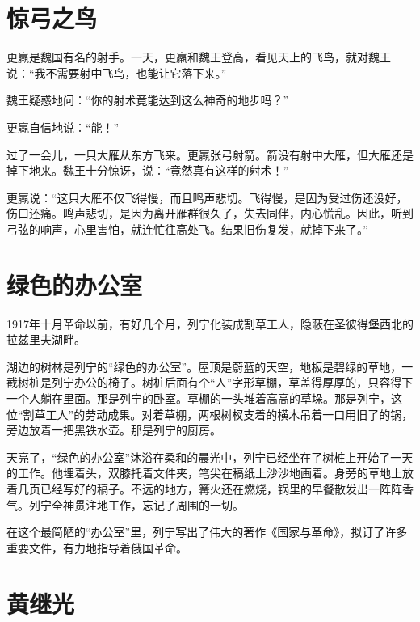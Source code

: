 \documentclass[12pt,UTF-8,openany]{ctexbook}
\begin{document}
\chapter{惊弓之鸟}

\begin{Large}
    
    更羸是魏国有名的射手。一天，更羸和魏王登高，看见天上的飞鸟，就对魏王说：“我不需要射中飞鸟，也能让它落下来。”
    
    魏王疑惑地问：“你的射术竟能达到这么神奇的地步吗？”
    
    更羸自信地说：“能！”
    
    过了一会儿，一只大雁从东方飞来。更羸张弓射箭。箭没有射中大雁，但大雁还是掉下地来。魏王十分惊讶，说：“竟然真有这样的射术！”
    
    更羸说：“这只大雁不仅飞得慢，而且鸣声悲切。飞得慢，是因为受过伤还没好，伤口还痛。鸣声悲切，是因为离开雁群很久了，失去同伴，内心慌乱。因此，听到弓弦的响声，心里害怕，就连忙往高处飞。结果旧伤复发，就掉下来了。”
    
\end{Large}

\chapter{绿色的办公室}

\begin{Large}
    
    1917年十月革命以前，有好几个月，列宁化装成割草工人，隐蔽在圣彼得堡西北的拉兹里夫湖畔。
    
    湖边的树林是列宁的“绿色的办公室”。屋顶是蔚蓝的天空，地板是碧绿的草地，一截树桩是列宁办公的椅子。树桩后面有个“人”字形草棚，草盖得厚厚的，只容得下一个人躺在里面。那是列宁的卧室。草棚的一头堆着高高的草垛。那是列宁，这位“割草工人”的劳动成果。对着草棚，两根树杈支着的横木吊着一口用旧了的锅，旁边放着一把黑铁水壶。那是列宁的厨房。
    
    天亮了，“绿色的办公室”沐浴在柔和的晨光中，列宁已经坐在了树桩上开始了一天的工作。他埋着头，双膝托着文件夹，笔尖在稿纸上沙沙地画着。身旁的草地上放着几页已经写好的稿子。不远的地方，篝火还在燃烧，锅里的早餐散发出一阵阵香气。列宁全神贯注地工作，忘记了周围的一切。
    
    在这个最简陋的“办公室”里，列宁写出了伟大的著作《国家与革命》，拟订了许多重要文件，有力地指导着俄国革命。
    
\end{Large}

\chapter{黄继光}
\end{document}
